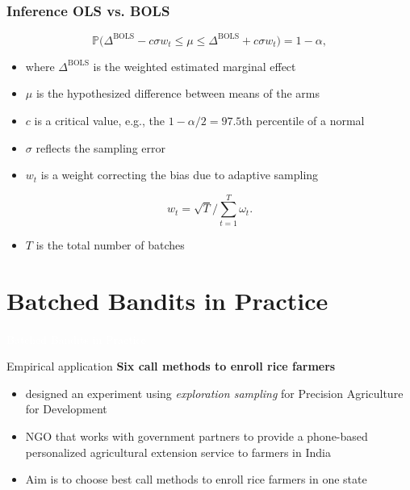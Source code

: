 \documentclass[11pt,table]{beamer}
\begin{document}
\begin{frame}\frametitle{Inference OLS vs. BOLS}
\renewcommand{\baselinestretch}{1}

$$\mathbb{P}\bigg(\Delta^{\text{BOLS}}-c\sigma w_t\leq\mu\leq\Delta^{\text{BOLS}}+ c\sigma w_t\bigg)=1-\alpha,$$
\begin{itemize}
    \item where $\Delta^{\text{BOLS}}$ is the weighted estimated marginal effect
    \item $\mu$ is the hypothesized difference between means of the arms
    \item $c$ is a critical value, e.g., the $1-\alpha/2=97.5$th percentile of a normal
    \item $\sigma$ reflects the sampling error
    \item $w_{t}$ is a weight correcting the bias due to adaptive sampling
\end{itemize}


$$w_{t}=\sqrt{T}/\sum^{T}_{t=1}\omega_t.$$

\begin{itemize}
    \item $T$ is the total number of batches
\end{itemize}

\end{frame}

\section{Batched Bandits in Practice}
{
\begin{frame}
\centering
\Huge
\textcolor{white}{Batched Bandits in Practice}
\thispagestyle{empty}
\end{frame}
}



\begin{frame}{Empirical application \citep{Kasy2021}}
\textbf{Six call methods to enroll rice farmers} 
\renewcommand{\baselinestretch}{1}

\begin{itemize}
    \item \cite{Kasy2021} designed an experiment using \emph{exploration sampling} for Precision Agriculture for Development
    \item  NGO that works with government partners to provide a phone-based personalized agricultural extension service to farmers in India
    \item Aim is to choose best call methods to enroll rice farmers in one state

\end{itemize}

\end{frame}
\end{document}
